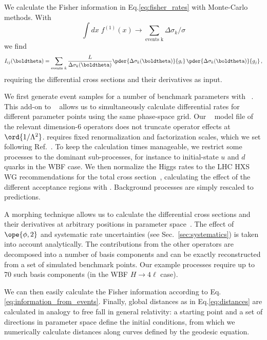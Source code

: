 We calculate the Fisher information in Eq.\;\eqref{eq:fisher_rates}
with Monte-Carlo methods. With
%
\begin{equation}
  \int \! d x \; f^{(1)} (x) \to \sum_{\text{events k}} \Delta \sigma_k / \sigma
\end{equation}
%
we find
%
\begin{equation}
  I_{ij} (\boldtheta)
  = \sum_{\text{events } k} \frac{L}{\Delta \sigma_k (\boldtheta)}
  \pder { \Delta \sigma_k (\boldtheta)} {g_i} \,
  \pder { \Delta \sigma_k (\boldtheta)} {g_j} \,,
  \label{eq:information_from_events}
\end{equation}
%
requiring the differential cross sections and their derivatives as
input.

We first generate event samples for a number of benchmark parameters
with ~\cite{madmax2}. This add-on to
~\cite{madgraph} allows us to simultaneously
calculate differential rates for different parameter points using the
same phase-space grid. Our ~\cite{feynrules} model
file of the relevant dimension-6 operators does not truncate operator
effects at $\ord{1/\Lambda^2}$.  requires fixed
renormalization and factorization scales, which we set following
Ref.~\cite{yr4}. To keep the calculation times manageable, we restrict
some processes to the dominant sub-processes, for instance to
initial-state $u$ and $d$ quarks in the WBF case.  We then normalize
the Higgs rates to the LHC HXS WG recommendations for the total cross
section~\cite{yr4}, calculating the effect of the different acceptance
regions with . Background processes are simply
rescaled to  predictions.

A morphing technique allows us to calculate the differential cross
sections and their derivatives at arbitrary positions in parameter
space~\cite{morphing}. The effect of $\ope{\phi,2}$ and systematic
rate uncertainties (see Sec.~\ref{sec:systematics}) is taken into
account analytically. The contributions from the other operators are
decomposed into a number of basis components and can be exactly
reconstructed from a set of simulated benchmark points. Our example
processes require up to 70 such basis components (in the WBF
$H \to 4 \ell$ case).

We can then easily calculate the Fisher information according to
Eq.\;\eqref{eq:information_from_events}. Finally, global distances as in
Eq.\;\eqref{eq:distances} are calculated in analogy to free fall in
general relativity: a starting point and a set of directions in
parameter space define the initial conditions, from which we
numerically calculate distances along curves defined by the geodesic
equation.





